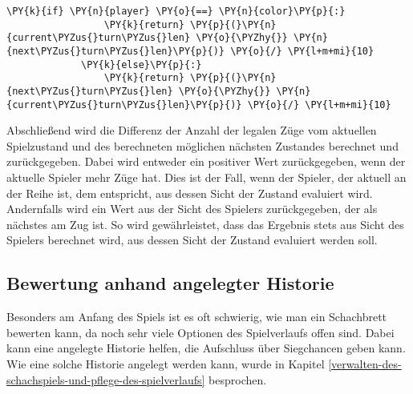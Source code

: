 \begin{Verbatim}[commandchars=\\\{\}]
             \PY{k}{if} \PY{n}{player} \PY{o}{==} \PY{n}{color}\PY{p}{:}
                 \PY{k}{return} \PY{p}{(}\PY{n}{current\PYZus{}turn\PYZus{}len} \PY{o}{\PYZhy{}} \PY{n}{next\PYZus{}turn\PYZus{}len}\PY{p}{)} \PY{o}{/} \PY{l+m+mi}{10}
             \PY{k}{else}\PY{p}{:}
                 \PY{k}{return} \PY{p}{(}\PY{n}{next\PYZus{}turn\PYZus{}len} \PY{o}{\PYZhy{}} \PY{n}{current\PYZus{}turn\PYZus{}len}\PY{p}{)} \PY{o}{/} \PY{l+m+mi}{10}
\end{Verbatim}

    Abschließend wird die Differenz der Anzahl der legalen Züge vom
aktuellen Spielzustand und des berechneten möglichen nächsten Zustandes
berechnet und zurückgegeben. Dabei wird entweder ein positiver Wert
zurückgegeben, wenn der aktuelle Spieler mehr Züge hat. Dies ist der
Fall, wenn der Spieler, der aktuell an der Reihe ist, dem entspricht,
aus dessen Sicht der Zustand evaluiert wird. Andernfalls wird ein Wert
aus der Sicht des Spielers zurückgegeben, der als nächstes am Zug ist.
So wird gewährleistet, dass das Ergebnis stets aus Sicht des Spielers
berechnet wird, aus dessen Sicht der Zustand evaluiert werden soll.

    \subsection{Bewertung anhand angelegter
Historie}\label{bewertung-an-hand-angelegter-historie}

Besonders am Anfang des Spiels ist es oft schwierig, wie man ein
Schachbrett bewerten kann, da noch sehr viele Optionen des Spielverlaufs
offen sind. Dabei kann eine angelegte Historie helfen, die Aufschluss
über Siegchancen geben kann. Wie eine solche Historie angelegt werden
kann, wurde in Kapitel \ref{verwalten-des-schachspiels-und-pflege-des-spielverlaufs} besprochen.

